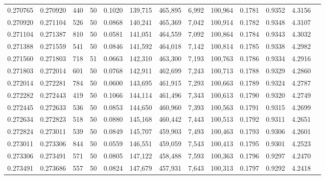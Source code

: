 \begin{tabular}{rrrrrrrrrrrrr}
0.270765 & 0.270920 &   440 &  50 &                                     0.1020 & 139,715 & 465,895 &   6,992 & 100,964 & 0.1781 & 0.9352 & 4.3156 \\
0.270920 & 0.271104 &   526 &  50 &                                     0.0868 & 140,241 & 465,369 &   7,042 & 100,914 & 0.1782 & 0.9348 & 4.3107 \\
0.271104 & 0.271387 &   810 &  50 &                                     0.0581 & 141,051 & 464,559 &   7,092 & 100,864 & 0.1784 & 0.9343 & 4.3032 \\
0.271388 & 0.271559 &   541 &  50 &                                     0.0846 & 141,592 & 464,018 &   7,142 & 100,814 & 0.1785 & 0.9338 & 4.2982 \\
0.271560 & 0.271803 &   718 &  51 &                                     0.0663 & 142,310 & 463,300 &   7,193 & 100,763 & 0.1786 & 0.9334 & 4.2916 \\
0.271803 & 0.272014 &   601 &  50 &                                     0.0768 & 142,911 & 462,699 &   7,243 & 100,713 & 0.1788 & 0.9329 & 4.2860 \\
0.272014 & 0.272281 &   784 &  50 &                                     0.0600 & 143,695 & 461,915 &   7,293 & 100,663 & 0.1789 & 0.9324 & 4.2787 \\
0.272282 & 0.272443 &   419 &  50 &                                     0.1066 & 144,114 & 461,496 &   7,343 & 100,613 & 0.1790 & 0.9320 & 4.2749 \\
0.272445 & 0.272633 &   536 &  50 &                                     0.0853 & 144,650 & 460,960 &   7,393 & 100,563 & 0.1791 & 0.9315 & 4.2699 \\
0.272634 & 0.272823 &   518 &  50 &                                     0.0880 & 145,168 & 460,442 &   7,443 & 100,513 & 0.1792 & 0.9311 & 4.2651 \\
0.272824 & 0.273011 &   539 &  50 &                                     0.0849 & 145,707 & 459,903 &   7,493 & 100,463 & 0.1793 & 0.9306 & 4.2601 \\
0.273011 & 0.273306 &   844 &  50 &                                     0.0559 & 146,551 & 459,059 &   7,543 & 100,413 & 0.1795 & 0.9301 & 4.2523 \\
0.273306 & 0.273491 &   571 &  50 &                                     0.0805 & 147,122 & 458,488 &   7,593 & 100,363 & 0.1796 & 0.9297 & 4.2470 \\
0.273491 & 0.273686 &   557 &  50 &                                     0.0824 & 147,679 & 457,931 &   7,643 & 100,313 & 0.1797 & 0.9292 & 4.2418 \\

\end{tabular}
